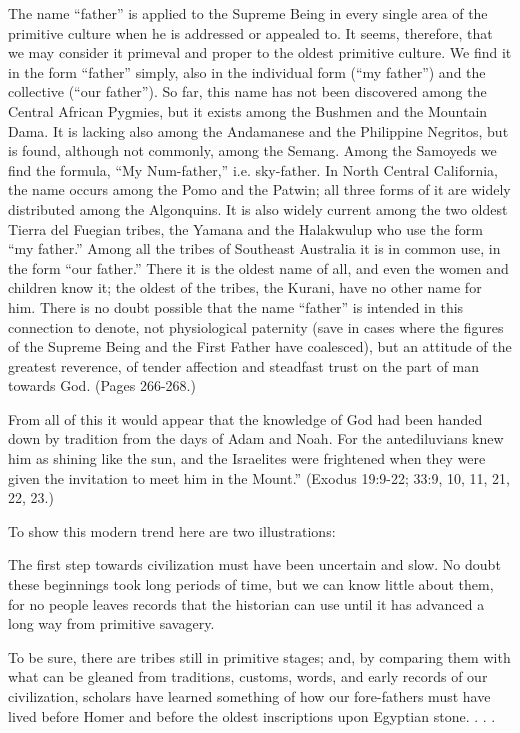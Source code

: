 The name ``father'' is applied to the Supreme Being in every single area of the primitive
culture when he is addressed or appealed to. It seems, therefore, that we may consider it
primeval and proper to the oldest primitive culture. We find it in the form ``father'' simply,
also in the individual form (``my father'') and the collective (``our father''). So far, this name
has not been discovered among the Central African Pygmies, but it exists among the
Bushmen and the Mountain Dama. It is lacking also among the Andamanese and the
Philippine Negritos, but is found, although not commonly, among the Semang. Among the
Samoyeds we find the formula, ``My Num-father,'' i.e. sky-father. In North Central
California, the name occurs among the Pomo and the Patwin; all three forms of it are widely
distributed among the Algonquins. It is also widely current among the two oldest Tierra del
Fuegian tribes, the Yamana and the Halakwulup who use the form ``my father.'' Among all
the tribes of Southeast Australia it is in common use, in the form ``our father.'' There it is the
oldest name of all, and even the women and children know it; the oldest of the tribes, the
Kurani, have no other name for him. There is no doubt possible that the name ``father'' is
intended in this connection to denote, not physiological paternity (save in cases where the
figures of the Supreme Being and the First Father have coalesced), but an attitude of the
greatest reverence, of tender affection and steadfast trust on the part of man towards God.
(Pages 266-268.)

From all of this it would appear that the knowledge of God had been handed down by
tradition from the days of Adam and Noah. For the antediluvians knew him as shining like
the sun, and the Israelites were frightened when they were given the invitation to meet him in
the Mount.'' (Exodus 19:9-22; 33:9, 10, 11, 21, 22, 23.)

To show this modern trend here are two illustrations:

The first step towards civilization must have been uncertain and slow. No doubt these
beginnings took long periods of time, but we can know little about them, for no people leaves
records that the historian can use until it has advanced a long way from primitive savagery.

To be sure, there are tribes still in primitive stages; and, by comparing them with what can be
gleaned from traditions, customs, words, and early records of our civilization, scholars have
learned something of how our fore-fathers must have lived before Homer and before the
oldest inscriptions upon Egyptian stone. . . .

